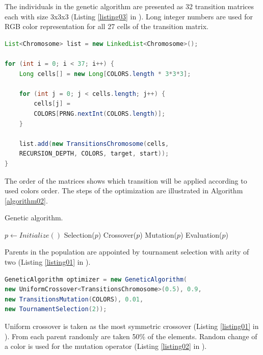 \documentclass{llncs}
\begin{document}
The individuals in the genetic algorithm are presented as 32 transition matrices each with size 3x3x3 (Listing \ref{listing03} in \cite{balabanov01}). Long integer numbers are used for RGB color representation for all 27 cells of the transition matrix. 

\begin{lstlisting}[language=Java, caption=Chromosomes Encoding, label=listing03]
List<Chromosome> list = new LinkedList<Chromosome>();

for (int i = 0; i < 37; i++) {
	Long cells[] = new Long[COLORS.length * 3*3*3];
	
	for (int j = 0; j < cells.length; j++) {
		cells[j] = 
		COLORS[PRNG.nextInt(COLORS.length)];
	}
	
	list.add(new TransitionsChromosome(cells, 
	RECURSION_DEPTH, COLORS, target, start));
}
\end{lstlisting}

The order of the matrices shows which transition will be applied according to used colors order. The steps of the optimization are illustrated in Algorithm \ref{algorithm02}. 

\begin{algorithm}
\caption{Genetic algorithm.}\label{algorithm02}
\begin{algorithmic}[1]
\State $p \gets Initialize()$
  \State Selection($p$)
  \State Crossover($p$)
  \State Mutation($p$)
  \State Evaluation($p$)
\EndWhile
\EndProcedure
\end{algorithmic}
\end{algorithm}
\FloatBarrier

Parents in the population are appointed by tournament selection with arity of two (Listing \ref{listing01} in \cite{balabanov01}). 

\begin{lstlisting}[language=Java, caption=Genetic Algorithm Parameters, label=listing01]
GeneticAlgorithm optimizer = new GeneticAlgorithm(
new UniformCrossover<TransitionsChromosome>(0.5), 0.9, 
new TransitionsMutation(COLORS), 0.01, 
new TournamentSelection(2));
\end{lstlisting}

Uniform crossover is taken as the most symmetric crossover (Listing \ref{listing01} in \cite{balabanov01}). From each parent randomly are taken 50\% of the elements. Random change of a color is used for the mutation operator (Listing \ref{listing02} in \cite{balabanov01}). 
\end{document}
